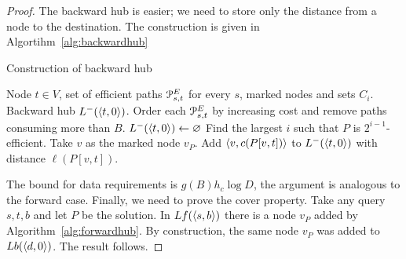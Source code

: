 \begin{proof}
The backward hub is easier; we need to store only the distance from a node to the destination.
The construction is given in Algortihm~\ref{alg:backwardhub}
\begin{algorithm}
\caption{Construction of backward hub}\label{alg:backwardhub}
\begin{algorithmic}[1]
\Require Node $t\in V$, set of efficient paths $\mathcal{P}_{s,t}^E$ for every $s$, marked nodes and sets $C_i$.
\Ensure Backward hub $L^-(\langle t,0\rangle)$.
\State Order each $\mathcal{P}_{s,t}^E$ by increasing cost and remove paths consuming more than $B$.
\State $L^-(\langle t,0\rangle)\gets \varnothing$
		\State Find the largest $i$ such that $P$ is $2^{i-1}$-efficient.
		\State Take $v$ as the marked node $v_P$.
		\State Add $\langle v,c(P[v,t])\rangle$ to $L^-(\langle t,0\rangle)$ with distance $\ell(P[v,t])$.
	\EndFor
\EndFor
\end{algorithmic}
\end{algorithm}

The bound for data requirements is $g(B) h_c\log D$, the argument is analogous to the forward case.
Finally, we need to prove the cover property.
Take any query $s,t,b$ and let $P$ be the solution.
In $Lf(\langle s,b\rangle)$ there is a node $v_P$ added by Algorithm~\ref{alg:forwardhub}.
By construction, the same node $v_P$ was added to $Lb(\langle d,0\rangle)$.
The result follows.
\end{proof}